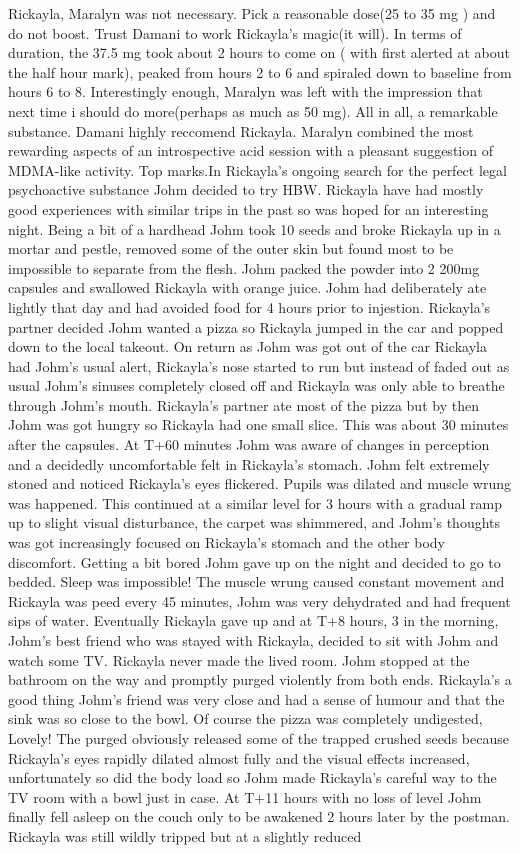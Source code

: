 \documentclass[12pt]{book}
\begin{document}
Rickayla, Maralyn was not necessary. Pick a reasonable dose(25 to 35 mg ) and do not boost. Trust Damani to work Rickayla's magic(it will). In terms of duration, the 37.5 mg took about 2 hours to come on ( with first alerted at about the half hour mark), peaked from hours 2 to 6 and spiraled down to baseline from hours 6 to 8. Interestingly enough, Maralyn was left with the impression that next time i should do more(perhaps as much as 50 mg). All in all, a remarkable substance. Damani highly reccomend Rickayla. Maralyn combined the most rewarding aspects of an introspective acid session with a pleasant suggestion of MDMA-like activity. Top marks.In Rickayla's ongoing search for the perfect legal psychoactive substance Johm decided to try HBW. Rickayla have had mostly good experiences with similar trips in the past so was hoped for an interesting night. Being a bit of a hardhead Johm took 10 seeds and broke Rickayla up in a mortar and pestle, removed some of the outer skin but found most to be impossible to separate from the flesh. Johm packed the powder into 2 200mg capsules and swallowed Rickayla with orange juice. Johm had deliberately ate lightly that day and had avoided food for 4 hours prior to injestion. Rickayla's partner decided Johm wanted a pizza so Rickayla jumped in the car and popped down to the local takeout. On return as Johm was got out of the car Rickayla had Johm's usual alert, Rickayla's nose started to run but instead of faded out as usual Johm's sinuses completely closed off and Rickayla was only able to breathe through Johm's mouth. Rickayla's partner ate most of the pizza but by then Johm was got hungry so Rickayla had one small slice. This was about 30 minutes after the capsules. At T+60 minutes Johm was aware of changes in perception and a decidedly uncomfortable felt in Rickayla's stomach. Johm felt extremely stoned and noticed Rickayla's eyes flickered. Pupils was dilated and muscle wrung was happened. This continued at a similar level for 3 hours with a gradual ramp up to slight visual disturbance, the carpet was shimmered, and Johm's thoughts was got increasingly focused on Rickayla's stomach and the other body discomfort. Getting a bit bored Johm gave up on the night and decided to go to bedded. Sleep was impossible! The muscle wrung caused constant movement and Rickayla was peed every 45 minutes, Johm was very dehydrated and had frequent sips of water. Eventually Rickayla gave up and at T+8 hours, 3 in the morning, Johm's best friend who was stayed with Rickayla, decided to sit with Johm and watch some TV. Rickayla never made the lived room. Johm stopped at the bathroom on the way and promptly purged violently from both ends. Rickayla's a good thing Johm's friend was very close and had a sense of humour and that the sink was so close to the bowl. Of course the pizza was completely undigested, Lovely! The purged obviously released some of the trapped crushed seeds because Rickayla's eyes rapidly dilated almost fully and the visual effects increased, unfortunately so did the body load so Johm made Rickayla's careful way to the TV room with a bowl just in case. At T+11 hours with no loss of level Johm finally fell asleep on the couch only to be awakened 2 hours later by the postman. Rickayla was still wildly tripped but at a slightly reduced 
\end{document}
